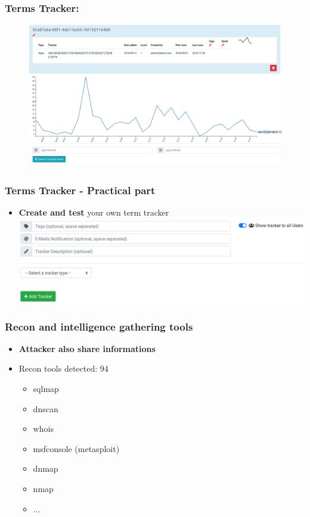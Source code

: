 \documentclass{beamer}
\begin{document}
\begin{frame}
    \frametitle{Terms Tracker:}
        \begin{figure}
            \includegraphics[scale=0.22]{images/term-tracker.png}
        \end{figure}
\end{frame}

\begin{frame}
    \frametitle{Terms Tracker - Practical part}
        \begin{itemize}
        	\item \textbf{Create and test} your own term tracker
        	\includegraphics[scale=0.3]{images/term-tracker-create.png}
        \end{itemize}
\end{frame}

\begin{frame}
    \frametitle{Recon and intelligence gathering tools}
        \begin{itemize}
            \item {\bf Attacker also share informations}
            \item Recon tools detected: 94
            \begin{itemize}
            	\item sqlmap
            	\item dnscan
            	\item whois
            	\item msfconsole (metasploit)
            	\item dnmap
            	\item nmap
            	\item ...
            \end{itemize}
        \end{itemize}
\end{frame}
\end{document}
